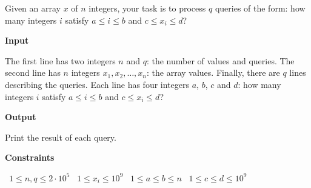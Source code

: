 Given an array $x$ of $n$ integers, your task is to process $q$ queries of the form: how many integers $i$ satisfy $a \le i \le b$ and $c \le x_i \le d$?

\vspace{0.3cm}\noindent\textbf{Input}

The first line has two integers $n$ and $q$: the number of values and queries.
The second line has $n$ integers $x_1,x_2,\dots,x_n$: the array values.
Finally, there are $q$ lines describing the queries. Each line has four integers $a$, $b$, $c$ and $d$: how many integers $i$ satisfy $a \le i \le b$ and $c \le x_i \le d$?

\vspace{0.3cm}\noindent\textbf{Output}

Print the result of each query.

\vspace{0.3cm}\noindent\textbf{Constraints}

\textbullet\ $1 \le n,q \le 2 \cdot 10^5$
\textbullet\ $1 \le x_i \le 10^9$
\textbullet\ $1 \le a \le b \le n$
\textbullet\ $1 \le c \le d \le 10^9$